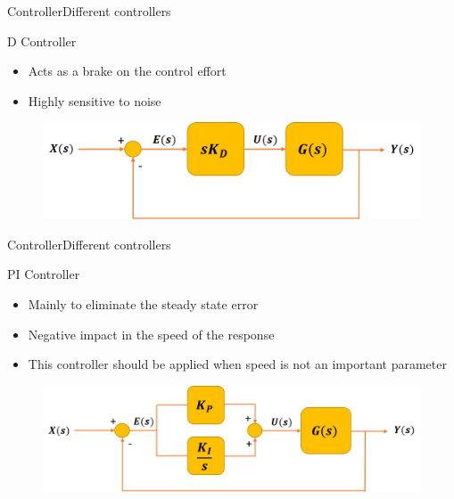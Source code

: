 \begin{frame}{Controller}{Different controllers}
  \begin{block}{D Controller}

	  \begin{itemize}
	  	\item Acts as a brake on the control effort
	  	\item Highly sensitive to noise
	  \end{itemize}

	  \begin{figure}
        \includegraphics[scale=0.26]{../report/figures/deriv_controller.png}
      \end{figure}
  
  \end{block}
\end{frame}

\begin{frame}{Controller}{Different controllers}
  \begin{block}{PI Controller}

	  \begin{itemize}
	  	\item Mainly to eliminate the steady state error
	  	\item Negative impact in the speed of the response
	  	\item This controller should be applied when speed is not an important parameter
	  \end{itemize}

	  \begin{figure}
        \includegraphics[scale=0.26]{../report/figures/PI_controller.png}
      \end{figure}
  
  \end{block}
\end{frame}



